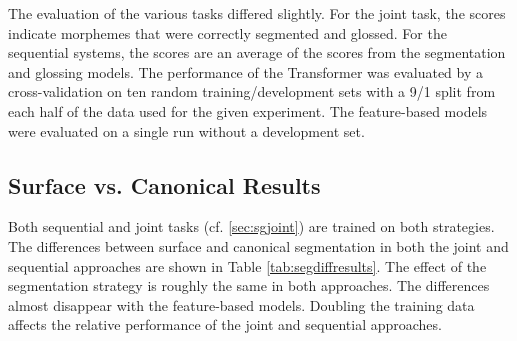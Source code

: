 The evaluation of the various tasks differed slightly. For the joint task, the scores indicate morphemes that were correctly segmented and glossed. For the sequential systems, the scores are an average of the scores from the segmentation and glossing models. The performance of the Transformer was evaluated by a cross-validation on ten random training/development sets with a 9/1 split from each half of the data used for the given experiment. The feature-based models were evaluated on a single run without a development set. 


\subsection{Surface vs. Canonical Results}

Both sequential and joint tasks (cf. \autoref{sec:sgjoint}) are trained on both strategies. The differences between surface and canonical segmentation in both the joint and sequential approaches are shown in Table \ref{tab:segdiffresults}. The effect of the segmentation strategy is roughly the same in both approaches. The differences almost disappear with the feature-based models. Doubling the training data affects the relative performance of the joint and sequential approaches.


